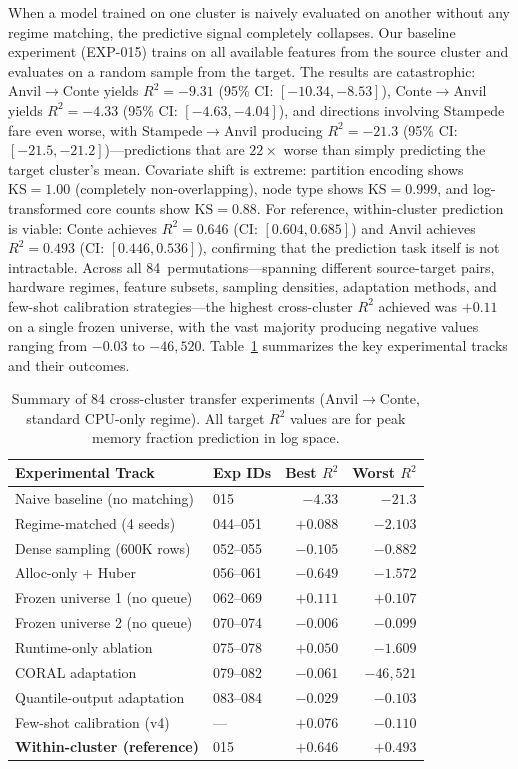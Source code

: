 \documentclass[sigconf]{acmart}
\begin{document}
When a model trained on one cluster is naively evaluated on another without any regime matching, the predictive signal completely collapses.
Our baseline experiment (EXP-015) trains on all available features from the source cluster and evaluates on a random sample from the target.
The results are catastrophic: Anvil$\to$Conte yields $R^2 = -9.31$ (95\% CI: $[-10.34, -8.53]$), Conte$\to$Anvil yields $R^2 = -4.33$ (95\% CI: $[-4.63, -4.04]$), and directions involving Stampede fare even worse, with Stampede$\to$Anvil producing $R^2 = -21.3$ (95\% CI: $[-21.5, -21.2]$)---predictions that are $22\times$ worse than simply predicting the target cluster's mean.
Covariate shift is extreme: partition encoding shows $\text{KS} = 1.00$ (completely non-overlapping), node type shows $\text{KS} = 0.999$, and log-transformed core counts show $\text{KS} = 0.88$.
For reference, within-cluster prediction is viable: Conte achieves $R^2 = 0.646$ (CI: $[0.604, 0.685]$) and Anvil achieves $R^2 = 0.493$ (CI: $[0.446, 0.536]$), confirming that the prediction task itself is not intractable.
Across all 84~permutations---spanning different source-target pairs, hardware regimes, feature subsets, sampling densities, adaptation methods, and few-shot calibration strategies---the highest cross-cluster $R^2$ achieved was $+0.11$ on a single frozen universe, with the vast majority producing negative values ranging from $-0.03$ to $-46{,}520$.
Table~\ref{tab:experiment-summary} summarizes the key experimental tracks and their outcomes.

\begin{table}[t]
\caption{Summary of 84 cross-cluster transfer experiments (Anvil$\to$Conte, standard CPU-only regime). All target $R^2$ values are for peak memory fraction prediction in log space.}
\label{tab:experiment-summary}
\centering
\small
\begin{tabular}{@{}llrr@{}}
\toprule
\textbf{Experimental Track} & \textbf{Exp IDs} & \textbf{Best $R^2$} & \textbf{Worst $R^2$} \\
\midrule
Naive baseline (no matching) & 015 & $-4.33$ & $-21.3$ \\
Regime-matched (4 seeds) & 044--051 & $+0.088$ & $-2.103$ \\
Dense sampling (600K rows) & 052--055 & $-0.105$ & $-0.882$ \\
Alloc-only + Huber & 056--061 & $-0.649$ & $-1.572$ \\
Frozen universe 1 (no queue) & 062--069 & $+0.111$ & $+0.107$ \\
Frozen universe 2 (no queue) & 070--074 & $-0.006$ & $-0.099$ \\
Runtime-only ablation & 075--078 & $+0.050$ & $-1.609$ \\
CORAL adaptation & 079--082 & $-0.061$ & $-46{,}521$ \\
Quantile-output adaptation & 083--084 & $-0.029$ & $-0.103$ \\
Few-shot calibration (v4) & --- & $+0.076$ & $-0.110$ \\
\midrule
\textbf{Within-cluster (reference)} & 015 & $+0.646$ & $+0.493$ \\
\bottomrule
\end{tabular}
\end{table}
\end{document}
